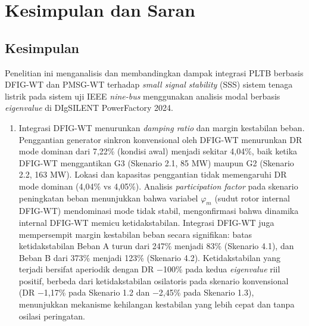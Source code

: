 \chapter{Kesimpulan dan Saran}

\section{Kesimpulan}

Penelitian ini menganalisis dan membandingkan dampak integrasi PLTB berbasis
DFIG-WT dan PMSG-WT terhadap \textit{small signal stability} (SSS) sistem tenaga
listrik pada sistem uji IEEE \textit{nine-bus} menggunakan analisis modal
berbasis \textit{eigenvalue} di DIgSILENT PowerFactory 2024.

\begin{enumerate}

\item Integrasi DFIG-WT menurunkan \textit{damping ratio} dan margin
kestabilan beban. Penggantian generator sinkron konvensional oleh DFIG-WT
menurunkan DR mode dominan dari 7,22\% (kondisi awal) menjadi sekitar 4,04\%,
baik ketika DFIG-WT menggantikan G3 (Skenario 2.1, 85 MW) maupun G2 (Skenario
2.2, 163 MW). Lokasi dan kapasitas penggantian tidak memengaruhi DR mode dominan
(4,04\% vs 4,05\%). Analisis \textit{participation factor} pada skenario
peningkatan beban menunjukkan bahwa variabel $\varphi_m$ (sudut rotor internal
DFIG-WT) mendominasi mode tidak stabil, mengonfirmasi bahwa dinamika internal
DFIG-WT memicu ketidakstabilan. Integrasi DFIG-WT juga mempersempit margin kestabilan beban secara signifikan:
batas ketidakstabilan Beban A turun dari 247\% menjadi 83\% (Skenario 4.1), dan
Beban B dari 373\% menjadi 123\% (Skenario 4.2). Ketidakstabilan yang terjadi
bersifat aperiodik dengan DR $-$100\% pada kedua \textit{eigenvalue} riil positif,
berbeda dari ketidakstabilan osilatoris pada skenario konvensional (DR $-$1,17\%
pada Skenario 1.2 dan $-$2,45\% pada Skenario 1.3), menunjukkan mekanisme
kehilangan kestabilan yang lebih cepat dan tanpa osilasi peringatan.


\end{enumerate}
